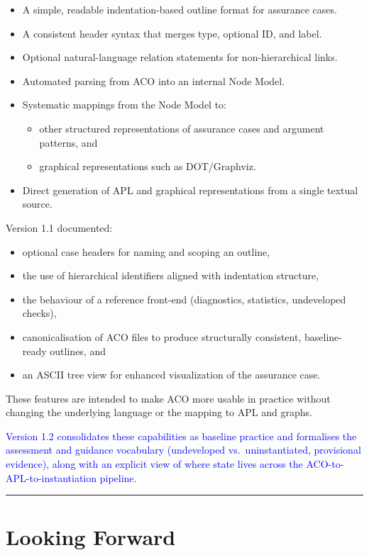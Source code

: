 \documentclass[11pt,twoside,a4paper]{article}
\begin{document}
\begin{itemize}[leftmargin=2em]
  \item A simple, readable indentation-based outline format for assurance cases.
  \item A consistent header syntax that merges type, optional ID, and label.
  \item Optional natural-language relation statements for non-hierarchical links.
  \item Automated parsing from ACO into an internal Node Model.
  \item Systematic mappings from the Node Model to:
  \begin{itemize}[leftmargin=1.5em]
    \item other structured representations of assurance cases and argument patterns, and
    \item graphical representations such as DOT/Graphviz.
  \end{itemize}
  \item Direct generation of APL and graphical representations from a single textual source.
\end{itemize}

Version 1.1 documented:
\begin{itemize}[leftmargin=2em]
  \item optional case headers for naming and scoping an outline,
  \item the use of hierarchical identifiers aligned with indentation structure,
  \item the behaviour of a reference front-end (diagnostics, statistics, undeveloped checks),
  \item canonicalisation of ACO files to produce structurally consistent, baseline-ready outlines, and
  \item an ASCII tree view for enhanced visualization of the assurance case.
\end{itemize}
These features are intended to make ACO more usable in practice without changing the underlying language or the mapping to APL and graphs.

\textcolor{blue}{Version 1.2 consolidates these capabilities as baseline practice and formalises the assessment and guidance vocabulary (undeveloped vs.\ uninstantiated, provisional evidence), along with an explicit view of where state lives across the ACO-to-APL-to-instantiation pipeline.}

\bigskip
\hrule
\bigskip

\section{Looking Forward}
\end{document}
